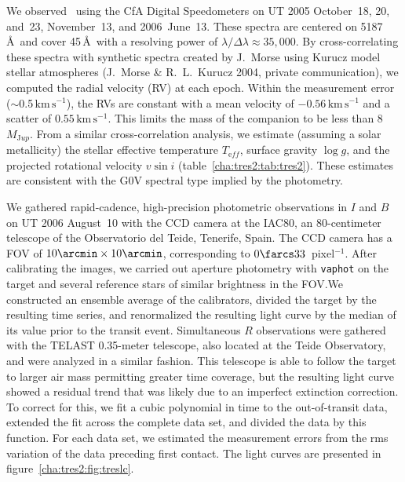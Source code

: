 We observed
\tresTwo\ using the CfA Digital Speedometers \citep{Latham:ASP:1992a} on
UT 2005 October~18, 20, and~23, November~13, and 2006~June~13.
These spectra are centered on 5187\,\AA\ and cover 45\,\AA\ with
a resolving power of $\lambda / \Delta \lambda \approx 35,\!000$. By
cross-correlating these spectra with synthetic spectra created by
J.~Morse using Kurucz model stellar atmospheres (J.~Morse \&
R.~L.~Kurucz 2004, private communication), we computed the radial
velocity (RV) at each epoch. Within the measurement error
($\sim$0.5\,$\mathrm{km\,s^{-1}}$), the RVs are
constant with a mean velocity of $-0.56\,\mathrm{km\,s^{-1}}$ and a
scatter of $0.55\,\mathrm{km\,s^{-1}}$.
This limits the mass of the companion to be less than 8\,$M_{\mathrm Jup}$.
From a similar cross-correlation analysis, we
estimate (assuming a solar metallicity) the stellar effective
temperature $T_{\mathrm eff}$, surface gravity $\log{g}$, and the
projected rotational velocity $v \sin{i}$ (table~\ref{cha:tres2:tab:tres2}).
These estimates are consistent with the G0V spectral type implied by
the photometry.

We gathered rapid-cadence, high-precision photometric observations in
$I$ and $B$ on UT 2006 August~10 with the CCD camera at the IAC80, an
80-centimeter telescope of the Observatorio del Teide, Tenerife, Spain. The
CCD camera has a FOV of $10\arcmin\times10\arcmin$, corresponding to
$0\farcs33$~pixel$^{-1}$. After calibrating the images, we carried out
aperture photometry with \texttt{vaphot} \citep{Deeg_Doyle:2001a} on the target
and several reference stars of similar brightness in the FOV.\@ We
constructed an ensemble average of the calibrators, divided the target
by the resulting time series, and renormalized the resulting light
curve by the median of its value prior to the transit event.
Simultaneous $R$ observations were gathered with the TELAST 0.35-meter
telescope, also located at the Teide Observatory, and were analyzed in
a similar fashion.  This telescope is able to follow the target to
larger air mass permitting greater time coverage, but the resulting
light curve showed a residual trend that was likely due to an
imperfect extinction correction. To correct for this, we fit a cubic
polynomial in time to the out-of-transit data, extended the fit across
the complete data set, and divided the data by this function. For each
data set, we estimated the measurement errors from the rms variation of
the data preceding first contact.  The light curves are presented in
figure~\ref{cha:tres2:fig:treslc}.

